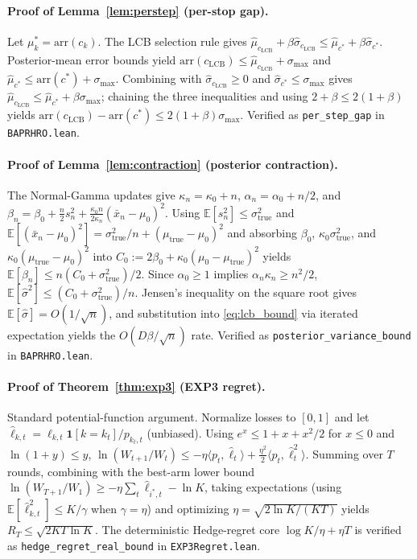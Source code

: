 \documentclass[opre,dblanonrev]{informs4}
\begin{document}
\begin{APPENDICES}
\paragraph{Proof of Lemma~\ref{lem:perstep} (per-stop gap).}
Let $\mu^*_k=\mathrm{arr}(c_k)$. The LCB selection rule gives
$\hat\mu_{c_{\mathrm{LCB}}}+\beta\hat\sigma_{c_{\mathrm{LCB}}}\leq
\hat\mu_{c^*}+\beta\hat\sigma_{c^*}$. Posterior-mean error bounds
yield $\mathrm{arr}(c_{\mathrm{LCB}})\leq
\hat\mu_{c_{\mathrm{LCB}}}+\sigma_{\max}$ and
$\hat\mu_{c^*}\leq\mathrm{arr}(c^*)+\sigma_{\max}$. Combining with
$\hat\sigma_{c_{\mathrm{LCB}}}\geq 0$ and
$\hat\sigma_{c^*}\leq\sigma_{\max}$ gives
$\hat\mu_{c_{\mathrm{LCB}}}\leq\hat\mu_{c^*}+\beta\sigma_{\max}$;
chaining the three inequalities and using
$2+\beta\leq 2(1+\beta)$ yields
$\mathrm{arr}(c_{\mathrm{LCB}})-\mathrm{arr}(c^*)\leq
2(1+\beta)\sigma_{\max}$. Verified as
\texttt{per\_step\_gap} in \texttt{BAPRHRO.lean}.

\paragraph{Proof of Lemma~\ref{lem:contraction} (posterior contraction).}
The Normal-Gamma updates give
$\kappa_n=\kappa_0+n$, $\alpha_n=\alpha_0+n/2$, and
$\beta_n=\beta_0+\tfrac{n}{2}s_n^2+\tfrac{\kappa_0 n}{2\kappa_n}
(\bar x_n-\mu_0)^2$. Using
$\mathbb{E}[s_n^2]\leq\sigma_{\mathrm{true}}^2$ and
$\mathbb{E}[(\bar x_n-\mu_0)^2]=\sigma_{\mathrm{true}}^2/n+
(\mu_{\mathrm{true}}-\mu_0)^2$ and absorbing
$\beta_0$, $\kappa_0\sigma_{\mathrm{true}}^2$, and
$\kappa_0(\mu_{\mathrm{true}}-\mu_0)^2$ into
$C_0:=2\beta_0+\kappa_0(\mu_0-\mu_{\mathrm{true}})^2$ yields
$\mathbb{E}[\beta_n]\leq n(C_0+\sigma_{\mathrm{true}}^2)/2$. Since
$\alpha_0\geq 1$ implies $\alpha_n\kappa_n\geq n^2/2$,
$\mathbb{E}[\hat\sigma^2]\leq(C_0+\sigma_{\mathrm{true}}^2)/n$. Jensen's
inequality on the square root gives
$\mathbb{E}[\hat\sigma]=O(1/\sqrt n)$, and substitution into
\eqref{eq:lcb_bound} via iterated expectation yields the
$O(D\beta/\sqrt n)$ rate. Verified as
\texttt{posterior\_variance\_bound} in \texttt{BAPRHRO.lean}.

\paragraph{Proof of Theorem~\ref{thm:exp3} (EXP3 regret).}
Standard potential-function argument. Normalize losses to
$[0,1]$ and let $\hat\ell_{k,t}=\ell_{k,t}\mathbf 1[k=k_t]/p_{k_t,t}$
(unbiased). Using $e^x\leq 1+x+x^2/2$ for $x\leq 0$ and
$\ln(1+y)\leq y$,
$\ln(W_{t+1}/W_t)\leq -\eta\langle p_t,\hat\ell_t\rangle
+\tfrac{\eta^2}{2}\langle p_t,\hat\ell_t^2\rangle$. Summing over
$T$ rounds, combining with the best-arm lower bound
$\ln(W_{T+1}/W_1)\geq -\eta\sum_t\hat\ell_{i^*,t}-\ln K$, taking
expectations (using
$\mathbb{E}[\hat\ell_{k,t}^2]\leq K/\gamma$ when $\gamma=\eta$) and
optimizing $\eta=\sqrt{2\ln K/(KT)}$ yields
$R_T\leq\sqrt{2KT\ln K}$. The deterministic Hedge-regret core
$\log K/\eta+\eta T$ is verified as
\texttt{hedge\_regret\_real\_bound} in \texttt{EXP3Regret.lean}.


\end{APPENDICES}
\end{document}
